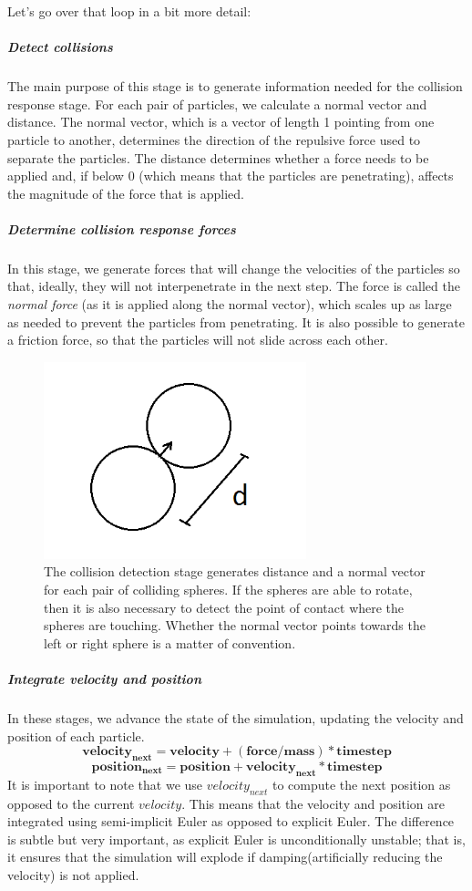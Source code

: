 \documentclass[]{article}
\begin{document}
	Let's go over that loop in a bit more detail:
	\subparagraph{Detect collisions} 
	The main purpose of this stage is to generate information needed for the collision response stage. For each pair of 
	particles, we calculate a normal vector and distance. The normal vector, which is a vector of length 1 pointing from 
	one particle to another, determines the direction of the repulsive force used to separate the particles. The distance 
	determines whether a force needs to be applied and, if below 0 (which means that the particles are penetrating), 
	affects the magnitude of the force that is applied.
	\subparagraph{Determine collision response forces}
	In this stage, we generate forces that will change the velocities of the particles so that, ideally, they will not
	interpenetrate in the next step. The force is called the \textit{normal force} (as it is applied along the normal 
	vector), which scales up as large as needed to prevent the particles from penetrating. It is also possible to generate 
	a friction force, so that the particles will not slide across each other.
	
	\begin{figure}[ht]
	  \centering
	  \includegraphics[width=3.0in]{images/SphereCollision}
	  \caption{The collision detection stage generates distance and a normal vector for each pair of colliding spheres.
	  If the spheres are able to rotate, then it is also necessary to detect the point of contact where the spheres are 
	  touching. Whether the normal vector points towards the left or right sphere is a matter of convention.}
	\end{figure}
	
	\subparagraph{Integrate velocity and position}
		In these stages, we advance the state of the simulation, updating the velocity and position of each particle.
		\[ \mathbf{velocity_{next} = velocity + (force/mass) * timestep} \]
		\[ \mathbf{position_{next} = position + velocity_{next} * timestep} \]
	It is important to note that we use \( velocity_{next} \) to compute the next position as opposed to the current 
	\(velocity\). This means that the velocity and position are integrated using semi-implicit Euler as opposed to
	explicit Euler. The difference is subtle but very important, as explicit Euler is unconditionally unstable;
	that is, it ensures that the simulation will explode if damping(artificially reducing the velocity) is not applied.\\
	
\end{document}
